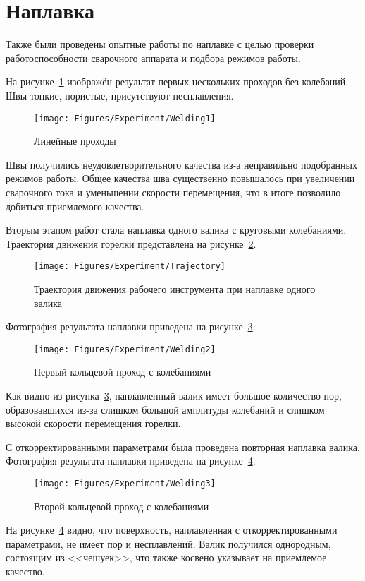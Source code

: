 \section{Наплавка}
Также были проведены опытные работы по наплавке с целью проверки работоспособности сварочного аппарата и подбора режимов работы.

На рисунке~\ref{fig:Experiment:Welding1} изображён результат первых нескольких проходов без колебаний.
Швы тонкие, пористые, присутствуют несплавления.

\begin{figure}[H]
    \centering
    \vspace{14pt}
    \texttt{[image: Figures/Experiment/Welding1]}
    \caption{Линейные проходы}
    \label{fig:Experiment:Welding1}
\end{figure}

Швы получились неудовлетворительного качества из-а неправильно подобранных режимов работы.
Общее качества шва существенно повышалось при увеличении сварочного тока и уменьшении скорости перемещения, что в итоге позволило добиться приемлемого качества.

Вторым этапом работ стала наплавка одного валика с круговыми колебаниями.
Траектория движения горелки представлена на рисунке~\ref{fig:Experiment:Freq}.

\begin{figure}[H]
    \centering
    \vspace{14pt}
    \texttt{[image: Figures/Experiment/Trajectory]}
    \caption{Траектория движения рабочего инструмента при наплавке одного валика}
    \label{fig:Experiment:Freq}
\end{figure}

Фотография результата наплавки приведена на рисунке~\ref{fig:Experiment:Welding2}.

\begin{figure}[H]
    \centering
    \vspace{14pt}
    \texttt{[image: Figures/Experiment/Welding2]}
    \caption{Первый кольцевой проход с колебаниями}
    \label{fig:Experiment:Welding2}
\end{figure}

Как видно из рисунка~\ref{fig:Experiment:Welding2}, наплавленный валик имеет большое количество пор, образовавшихся из-за слишком большой амплитуды колебаний и слишком высокой скорости перемещения горелки.

С откорректированными параметрами была проведена повторная наплавка валика.
Фотография результата наплавки приведена на рисунке~\ref{fig:Experiment:Welding3}.

\begin{figure}[H]
    \centering
    \vspace{14pt}
    \texttt{[image: Figures/Experiment/Welding3]}
    \caption{Второй кольцевой проход с колебаниями}
    \label{fig:Experiment:Welding3}
\end{figure}

На рисунке~\ref{fig:Experiment:Welding3} видно, что поверхность, наплавленная с откорректированными параметрами, не имеет пор и несплавлений.
Валик получился однородным, состоящим из <<чешуек>>, что также косвено указывает на приемлемое качество.
